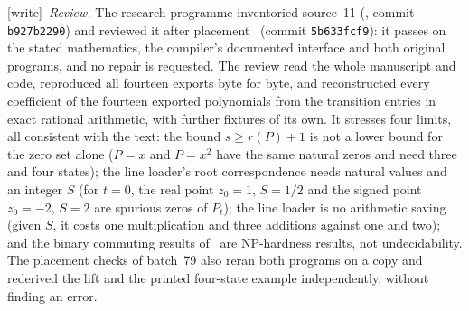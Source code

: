 \documentclass[11pt,letterpaper]{article}
\theoremstyle{definition}
\theoremstyle{remark}
\newcommand{\wtag}{\textup{[write]}}
\begin{document}
\wtag\ \emph{Review.} The research programme inventoried source~11 (\cite{intake79}, commit \texttt{b927b2290}) and reviewed it after placement~\cite{reviewMX} (commit \texttt{5b633fcf9}): it passes on the stated mathematics, the compiler's documented interface and both original programs, and no repair is requested. The review read the whole manuscript and code, reproduced all fourteen exports byte for byte, and reconstructed every coefficient of the fourteen exported polynomials from the transition entries in exact rational arithmetic, with further fixtures of its own. It stresses four limits, all consistent with the text: the bound $s\geq r(P)+1$ is not a lower bound for the zero set alone ($P=x$ and $P=x^2$ have the same natural zeros and need three and four states); the line loader's root correspondence needs natural values and an integer $S$ (for $t=0$, the real point $z_0=1$, $S=1/2$ and the signed point $z_0=-2$, $S=2$ are spurious zeros of $P_t$); the line loader is no arithmetic saving (given $S$, it costs one multiplication and three additions against one and two); and the binary commuting results of~\cite{bell-semukhin} are NP-hardness results, not undecidability. The placement checks of batch~79 also reran both programs on a copy and rederived the lift and the printed four-state example independently, without finding an error.
\end{document}
